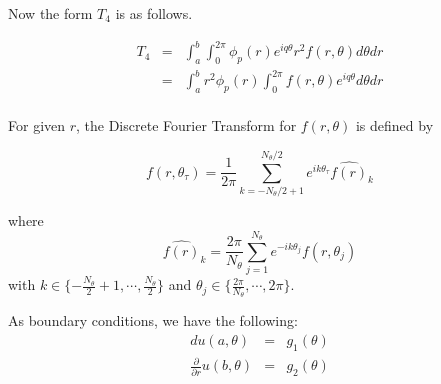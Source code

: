 Now the form $T_4$ is as follows.

\begin{eqnarray}
T_4 &=& \int_a^b \int_0^{2\pi} \phi_p(r) e^{iq\theta} r^2 f(r,\theta) d\theta dr \\
    &=& \int_a^b r^2\phi_p(r) \int_0^{2\pi} f(r,\theta) e^{iq\theta} d\theta dr \\
\end{eqnarray}

For given $r$, the Discrete Fourier Transform for $f(r, \theta)$ is defined by

\begin{equation}
f(r, \theta_\tau) = \frac{1}{2\pi} \sum_{k=-N_\theta/2+1}^{N_\theta/2} e^{ik\theta_\tau} \widehat{f(r)}_k
\end{equation}

where
\begin{equation}
\widehat{f(r)}_k = \frac{2\pi}{N_\theta} \sum_{j=1}^{N_\theta} e^{-ik\theta_j} f(r, \theta_j)
\end{equation}
with $ k \in \{-\frac{N_\theta}{2}+1, \cdots, \frac{N_\theta}{2}\}$ and $\theta_j \in \{ \frac{2\pi}{N_\theta}, \cdots, 2\pi  \}$.

As boundary conditions, we have the following:
\begin{eqnarray}
du(a,\theta) &=& g_1(\theta) \\
\frac{\partial}{\partial r} u(b,\theta) &=& g_2(\theta)
\end{eqnarray}






